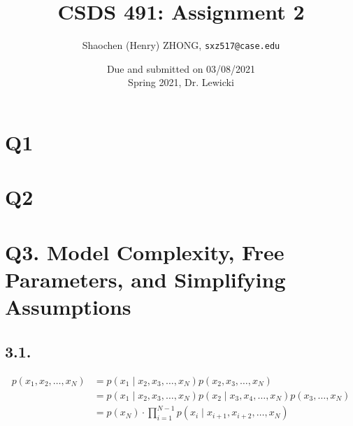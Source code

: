 \documentclass[11pt]{article}
\newcommand{\ilc}{\texttt}
\begin{document}
\title{\textbf{CSDS 491: Assignment 2}}

\author{Shaochen (Henry) ZHONG, \ilc{sxz517@case.edu}}

\date{Due and submitted on 03/08/2021 \\ Spring 2021, Dr. Lewicki}
\maketitle


%
%
%
%


\section*{Q1}

\section*{Q2}

\section*{Q3. Model Complexity, Free Parameters, and Simplifying Assumptions}

\subsection*{3.1.}

\begin{align*}
    p(x_1, x_2, \dots, x_N) &= p(x_1 \mid x_2, x_3, \dots, x_N) p(x_2, x_3, \dots, x_N) \\
    &= p(x_1 \mid x_2, x_3, \dots, x_N) p(x_2 \mid x_3, x_4, \dots, x_N) p(x_3, \dots, x_N) \\
    &= p(x_N) \cdot \prod_{i = 1}^{N-1} p(x_i \mid x_{i+1},  x_{i+2}, \dots, x_{N})
\end{align*}
\end{document}

